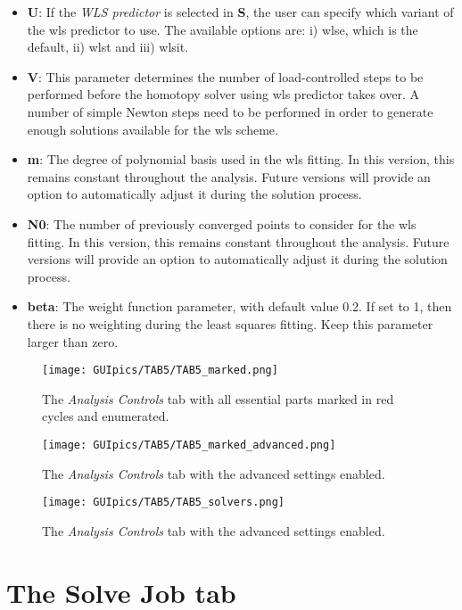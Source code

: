 \begin{appendices}
\begin{itemize}
	\item \textbf{U}: If the \textit{WLS predictor} is selected in \textbf{S}, 
	the user can specify which variant of the \acrshort{wls} predictor to use. 
	The available options are: i) \acrshort{wlse}, which is the default, ii) 
	\acrshort{wlst} and iii) \acrshort{wlsit}.
	\item \textbf{V}: This parameter determines the number of load-controlled 
	steps to be performed before the homotopy solver using \acrshort{wls} 
	predictor takes over. A number of simple Newton steps need to be performed 
	in order to generate enough solutions available for the \acrshort{wls} 
	scheme.
	\item \textbf{m}: The degree of polynomial basis used in the \acrshort{wls} 
	fitting. In this version, this remains constant throughout the analysis. 
	Future versions will provide an option to automatically adjust it during 
	the solution process.
	\item \textbf{N0}: The number of previously converged points to consider 
	for the \acrshort{wls} fitting. In this version, this remains constant 
	throughout the analysis. Future versions will provide an option to 
	automatically adjust  it during the solution process.
	\item \textbf{beta}: The weight function parameter, with default value 0.2. 
	If set to 1, then there is no weighting during the least squares fitting. 
	Keep this parameter larger than zero.
\end{itemize}
\begin{figure}
	\centering
	\texttt{[image: GUIpics/TAB5/TAB5\_marked.png]}
	\caption{The \textit{Analysis Controls} tab with all essential parts 
		marked in red cycles and enumerated.}
	\label{fig:TAB5_marked}
\end{figure}

\begin{figure}
	\centering
	\texttt{[image: GUIpics/TAB5/TAB5\_marked\_advanced.png]}
	\caption{The \textit{Analysis Controls} tab with the advanced settings 
		enabled.}
	\label{fig:TAB5_marked_advanced}
\end{figure}

\begin{figure}
	\centering
	\texttt{[image: GUIpics/TAB5/TAB5\_solvers.png]}
	\caption{The \textit{Analysis Controls} tab with the advanced settings 
		enabled.}
	\label{fig:TAB5_solvers}
\end{figure}

\section*{The Solve Job tab}


\end{appendices}
